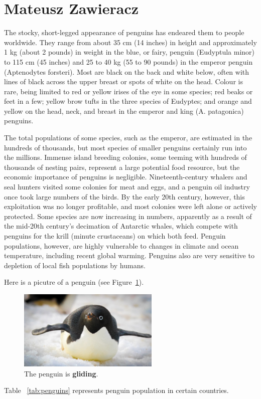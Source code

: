 \newpage
\section{Mateusz Zawieracz}
\label{sec:matzaw}

\par
The stocky, short-legged appearance of penguins has endeared them to people worldwide. They range from about 35 cm (14 inches) in height and approximately 1 kg (about 2 pounds) in weight in the blue, or fairy, penguin (Eudyptula minor) to 115 cm (45 inches) and 25 to 40 kg (55 to 90 pounds) in the emperor penguin (Aptenodytes forsteri). Most are black on the back and white below, often with lines of black across the upper breast or spots of white on the head. Colour is rare, being limited to red or yellow irises of the eye in some species; red beaks or feet in a few; yellow brow tufts in the three species of Eudyptes; and orange and yellow on the head, neck, and breast in the emperor and king (A. patagonica) penguins.

\par
The total populations of some species, such as the emperor, are estimated in the hundreds of thousands, but most species of smaller penguins certainly run into the millions. Immense island breeding colonies, some teeming with hundreds of thousands of nesting pairs, represent a large potential food resource, but the economic importance of penguins is negligible. Nineteenth-century whalers and seal hunters visited some colonies for meat and eggs, and a penguin oil industry once took large numbers of the birds. By the early 20th century, however, this exploitation was no longer profitable, and most colonies were left alone or actively protected. Some species are now increasing in numbers, apparently as a result of the mid-20th century’s decimation of Antarctic whales, which compete with penguins for the krill (minute crustaceans) on which both feed. Penguin populations, however, are highly vulnerable to changes in climate and ocean temperature, including recent global warming. Penguins also are very sensitive to depletion of local fish populations by humans.



Here is a picutre of a penguin (see Figure~\ref{fig:penguin}).

\begin{figure}[htbp] 
    \centering
    \includegraphics[width=0.6\textwidth]{pictures/penguin.jpg}
    \caption{The penguin is \textbf{gliding}.}
    \label{fig:penguin}
\end{figure}
\newpage
Table ~\ref{tab:penguins} represents penguin population in certain countries.


